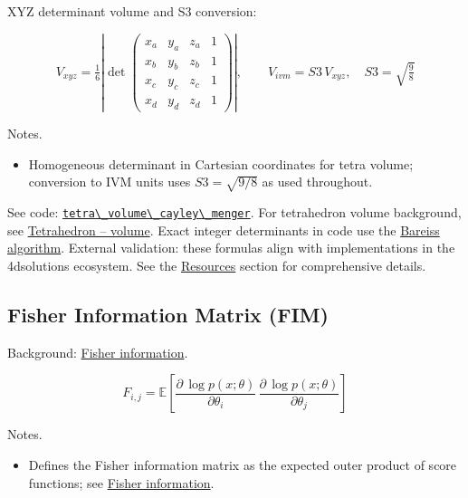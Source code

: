\documentclass[
  10pt,
]{article}
\newcommand{\passthrough}[1]{#1}
\providecommand{\tightlist}{%
  \setlength{\itemsep}{0pt}\setlength{\parskip}{0pt}}
\begin{document}
XYZ determinant volume and S3 conversion:

\begin{equation}\label{eq:supp_xyz_det}
V_{xyz} = \tfrac{1}{6} \left| \det \begin{pmatrix}
 x_a & y_a & z_a & 1 \\
 x_b & y_b & z_b & 1 \\
 x_c & y_c & z_c & 1 \\
  x_d & y_d & z_d & 1
\end{pmatrix} \right|, \qquad V_{ivm} = S3\, V_{xyz},\quad S3=\sqrt{\tfrac{9}{8}}
\end{equation}

Notes.

\begin{itemize}
\tightlist
\item
  Homogeneous determinant in Cartesian coordinates for tetra volume;
  conversion to IVM units uses \(S3=\sqrt{9/8}\) as used throughout.
\end{itemize}

See code:
\href{03_quadray_methods.md\#code:tetra_volume_cayley_menger}{\passthrough{\lstinline!tetra\_volume\_cayley\_menger!}}.
For tetrahedron volume background, see
\href{https://en.wikipedia.org/wiki/Tetrahedron\#Volume}{Tetrahedron --
volume}. Exact integer determinants in code use the
\href{https://en.wikipedia.org/wiki/Bareiss_algorithm}{Bareiss
algorithm}. External validation: these formulas align with
implementations in the 4dsolutions ecosystem. See the
\href{07_resources.md}{Resources} section for comprehensive details.

\hypertarget{eq:fim}{%
\subsection{Fisher Information Matrix (FIM)}\label{eq:fim}}

Background:
\href{https://en.wikipedia.org/wiki/Fisher_information}{Fisher
information}.

\begin{equation}\label{eq:supp_fim}
F_{i,j} = \mathbb{E}\left[ \frac{\partial \, \log p(x;\theta)}{\partial \theta_i}\, \frac{\partial \, \log p(x;\theta)}{\partial \theta_j} \right]
\end{equation}

Notes.

\begin{itemize}
\tightlist
\item
  Defines the Fisher information matrix as the expected outer product of
  score functions; see
  \href{https://en.wikipedia.org/wiki/Fisher_information}{Fisher
  information}.
\end{itemize}
\end{document}
